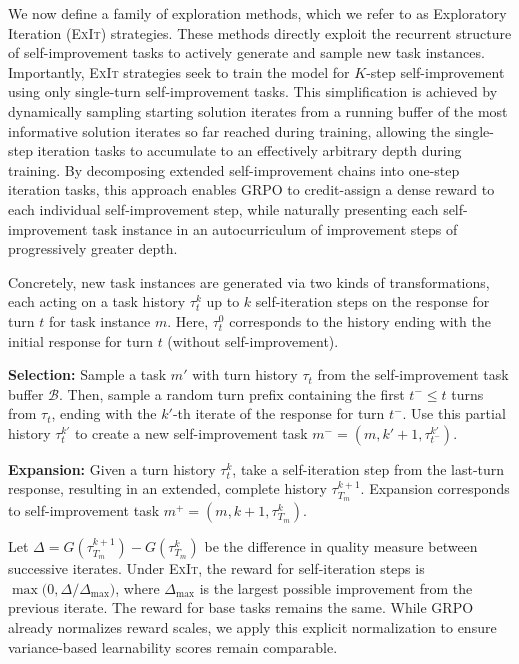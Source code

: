 \documentclass[10pt]{article} %
\newcommand{\methodname}{\textsc{ExIt}}
\begin{document}
We now define a family of exploration methods, which we refer to as Exploratory Iteration (\methodname{}) strategies. These methods directly exploit the recurrent structure of self-improvement tasks to actively generate and sample new task instances. Importantly, \methodname{} strategies seek to train the model for $K$-step self-improvement using only single-turn self-improvement tasks. This simplification is achieved by dynamically sampling starting solution iterates from a running buffer of the most informative solution iterates so far reached during training, allowing the single-step iteration tasks to accumulate to an effectively arbitrary depth during training. By decomposing extended self-improvement chains into one-step iteration tasks, this approach enables GRPO to credit-assign a dense reward to each individual self-improvement step, while naturally presenting each self-improvement task instance in an autocurriculum of improvement steps of progressively greater depth. 

Concretely, new task instances are generated via two kinds of transformations, each acting on a task history $\tau^k_t$ up to $k$ self-iteration steps on the response for turn $t$ for task instance $m$. Here, $\tau^0_t$ corresponds to the history ending with the initial response for turn $t$ (without self-improvement).

{\color{orange} \textbf{Selection:}} Sample a task $m'$ with turn history $\tau_t$ from the self-improvement task buffer $\mathcal{B}$. Then, sample a random turn prefix containing the first $t^{-} \le t$ turns from $\tau_t$, ending with the $k'$-th iterate of the response for turn $t^{-}$. Use this partial history $\tau^{k'}_t$ to create a new self-improvement task $m^- = (m, k'+1, \tau^{k'}_{t^-})$.

{\color{blue} \textbf{Expansion:}} Given a turn history $\tau^k_t$, take a self-iteration step from the last-turn response, resulting in an extended, complete history $\tau^{k+1}_{T_{m}}$. Expansion corresponds to self-improvement task $m^+ = (m, k + 1, \tau^{k}_{T_{m}})$.

Let $\Delta = G(\tau^{k+1}_{T_{m}}) - G(\tau^{k}_{T_{m}})$ be the difference in quality measure between successive iterates. Under \methodname{}, the reward for self-iteration steps is $\max\big(0, \Delta/\Delta_{\text{max}})$, where $\Delta_{\text{max}}$ is the largest possible improvement from the previous iterate. The reward for base tasks remains the same. While GRPO already normalizes reward scales, we apply this explicit normalization to ensure variance-based learnability scores remain comparable.
\end{document}

